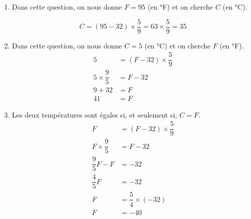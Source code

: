 \begin{enumerate}
    \item Dans cette question, on nous donne $F =95$ (en °F) et on cherche $C$ (en °C). \par \vskip-3mm
       $$C =(95-32)\times\dfrac59  =63\times\dfrac59 =35$$
    \item Dans cette question, on nous donne $C =5$ (en °C) et on cherche $F$ (en °F). \vskip-7mm
       \begin{align*}
          5 &=(F-32)\times\dfrac59 \\
          5\times\dfrac95 &=F-32 \\
          9+32 &= F \\
          41 &=F
       \end{align*}
    \item Les deux températures sont égales si, et seulement si, $C =F$. \vskip-7mm
       \begin{align*}
          F &=(F-32)\times\dfrac59 \\
          F\times\dfrac95 &=F-32 \\
          \dfrac95F-F &=-32 \\
          \dfrac45F &=-32 \\
          F &=\dfrac54\times(-32) \\
          F &=-40
       \end{align*}
 \end{enumerate}